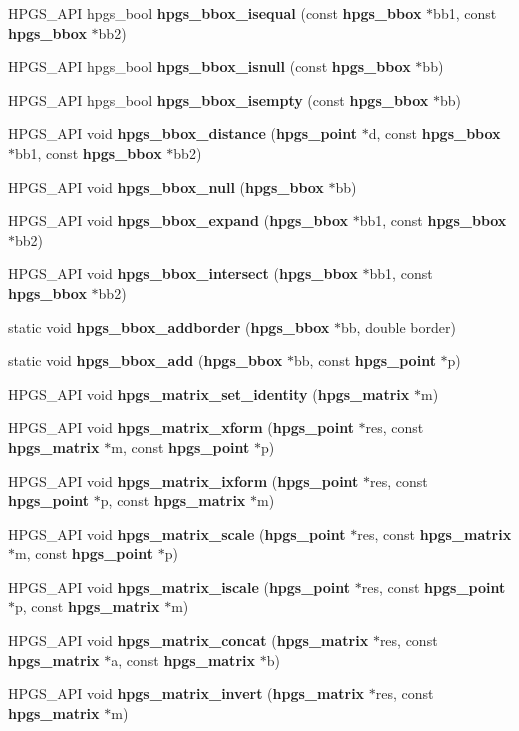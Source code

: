 \begin{CompactItemize}
\item 
HPGS\_\-API hpgs\_\-bool {\bf hpgs\_\-bbox\_\-isequal} (const {\bf hpgs\_\-bbox} $\ast$bb1, const {\bf hpgs\_\-bbox} $\ast$bb2)
\item 
HPGS\_\-API hpgs\_\-bool {\bf hpgs\_\-bbox\_\-isnull} (const {\bf hpgs\_\-bbox} $\ast$bb)
\item 
HPGS\_\-API hpgs\_\-bool {\bf hpgs\_\-bbox\_\-isempty} (const {\bf hpgs\_\-bbox} $\ast$bb)
\item 
HPGS\_\-API void {\bf hpgs\_\-bbox\_\-distance} ({\bf hpgs\_\-point} $\ast$d, const {\bf hpgs\_\-bbox} $\ast$bb1, const {\bf hpgs\_\-bbox} $\ast$bb2)
\item 
HPGS\_\-API void {\bf hpgs\_\-bbox\_\-null} ({\bf hpgs\_\-bbox} $\ast$bb)
\item 
HPGS\_\-API void {\bf hpgs\_\-bbox\_\-expand} ({\bf hpgs\_\-bbox} $\ast$bb1, const {\bf hpgs\_\-bbox} $\ast$bb2)
\item 
HPGS\_\-API void {\bf hpgs\_\-bbox\_\-intersect} ({\bf hpgs\_\-bbox} $\ast$bb1, const {\bf hpgs\_\-bbox} $\ast$bb2)
\item 
static void {\bf hpgs\_\-bbox\_\-addborder} ({\bf hpgs\_\-bbox} $\ast$bb, double border)
\item 
static void {\bf hpgs\_\-bbox\_\-add} ({\bf hpgs\_\-bbox} $\ast$bb, const {\bf hpgs\_\-point} $\ast$p)
\item 
HPGS\_\-API void {\bf hpgs\_\-matrix\_\-set\_\-identity} ({\bf hpgs\_\-matrix} $\ast$m)
\item 
HPGS\_\-API void {\bf hpgs\_\-matrix\_\-xform} ({\bf hpgs\_\-point} $\ast$res, const {\bf hpgs\_\-matrix} $\ast$m, const {\bf hpgs\_\-point} $\ast$p)
\item 
HPGS\_\-API void {\bf hpgs\_\-matrix\_\-ixform} ({\bf hpgs\_\-point} $\ast$res, const {\bf hpgs\_\-point} $\ast$p, const {\bf hpgs\_\-matrix} $\ast$m)
\item 
HPGS\_\-API void {\bf hpgs\_\-matrix\_\-scale} ({\bf hpgs\_\-point} $\ast$res, const {\bf hpgs\_\-matrix} $\ast$m, const {\bf hpgs\_\-point} $\ast$p)
\item 
HPGS\_\-API void {\bf hpgs\_\-matrix\_\-iscale} ({\bf hpgs\_\-point} $\ast$res, const {\bf hpgs\_\-point} $\ast$p, const {\bf hpgs\_\-matrix} $\ast$m)
\item 
HPGS\_\-API void {\bf hpgs\_\-matrix\_\-concat} ({\bf hpgs\_\-matrix} $\ast$res, const {\bf hpgs\_\-matrix} $\ast$a, const {\bf hpgs\_\-matrix} $\ast$b)
\item 
HPGS\_\-API void {\bf hpgs\_\-matrix\_\-invert} ({\bf hpgs\_\-matrix} $\ast$res, const {\bf hpgs\_\-matrix} $\ast$m)

\end{CompactItemize}
